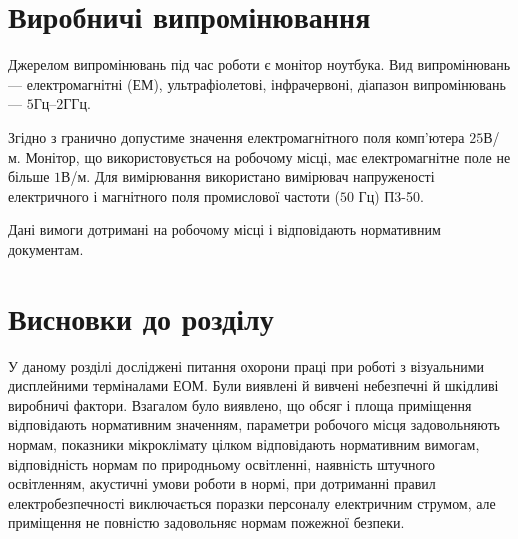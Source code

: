 \section{Виробничі випромінювання}

Джерелом випромінювань під час роботи є монітор ноутбука. 
Вид випромінювань --- електромагнітні (ЕМ), ультрафіолетові, інфрачервоні,
діапазон випромінювань --- $5$Гц–$2$ГГц.

Згідно з \cite{DSN} гранично допустиме значення електромагнітного поля
комп’ютера $25$В/м.
Монітор, що використовується на робочому місці, має електромагнітне поле
не більше $1$В/м.
Для вимірювання використано вимірювач напруженості електричного
і магнітного поля промислової частоти ($50$ Гц) П3-50.

Дані вимоги дотримані на робочому місці і відповідають нормативним документам.

\section*{Висновки до розділу }

У даному розділі досліджені питання охорони праці при роботі з візуальними
дисплейними терміналами ЕОМ.
Були виявлені й вивчені небезпечні й шкідливі виробничі фактори.
Взагалом було виявлено, що
обсяг і площа приміщення  відповідають нормативним значенням,
параметри робочого місця задовольняють нормам,
показники мікроклімату цілком відповідають нормативним вимогам,
відповідність нормам по природньому освітленні, наявність штучного освітленням,
акустичні умови роботи в нормі,
при дотриманні правил електробезпечності виключається поразки персоналу
електричним струмом,
але приміщення не повністю задовольняє нормам пожежної безпеки.

